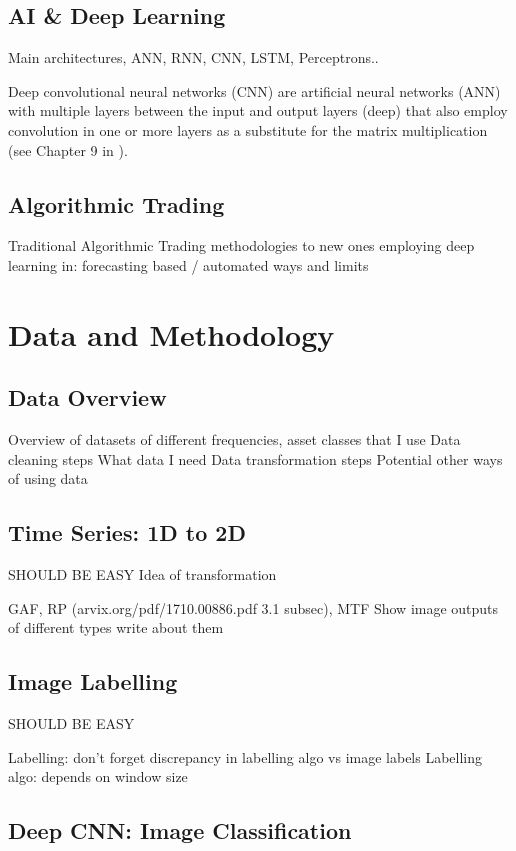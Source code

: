 \documentclass[11pt, a4paper]{article}
\begin{document}
\subsection{AI \& Deep Learning}
Main architectures, ANN, RNN, CNN, LSTM, Perceptrons..

Deep convolutional neural networks (CNN) are artificial neural networks (ANN) with multiple layers between the input and output layers (deep) that also employ convolution in one or more layers 
as a substitute for the matrix multiplication (see Chapter 9 in \cite{goodfellow2016deep}). 


\subsection{Algorithmic Trading}
Traditional Algorithmic Trading methodologies to new ones employing deep learning in: forecasting based / automated ways and limits

\section{Data and Methodology}
\subsection{Data Overview}
Overview of datasets of different frequencies, asset classes that I use
Data cleaning steps
What data I need
Data transformation steps 
Potential other ways of using data

\subsection{Time Series: 1D to 2D}
SHOULD BE EASY
Idea of transformation

GAF, RP (arvix.org/pdf/1710.00886.pdf 3.1 subsec), MTF
Show image outputs of different types
write about them 

\subsection{Image Labelling}
SHOULD BE EASY

Labelling: don't forget discrepancy in labelling algo vs image labels
Labelling algo: depends on window size

\subsection{Deep CNN: Image Classification}
\end{document}
